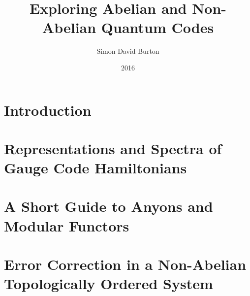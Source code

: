 \documentclass[11pt,twoside,openright]{report}
\title{Exploring Abelian and Non-Abelian Quantum Codes}
\author{Simon David Burton}
\date{2016}
\newcommand{\todo}[1]{\textcolor{red}{#1}}
\begin{document}
\maketitle


\declaration


\tableofcontents

\chapter{Introduction}

%
%

%


\chapter{Representations and Spectra of Gauge Code Hamiltonians}




\chapter{A Short Guide to Anyons and Modular Functors}




\chapter{Error Correction in a Non-Abelian Topologically Ordered System}





{}

\end{document}

